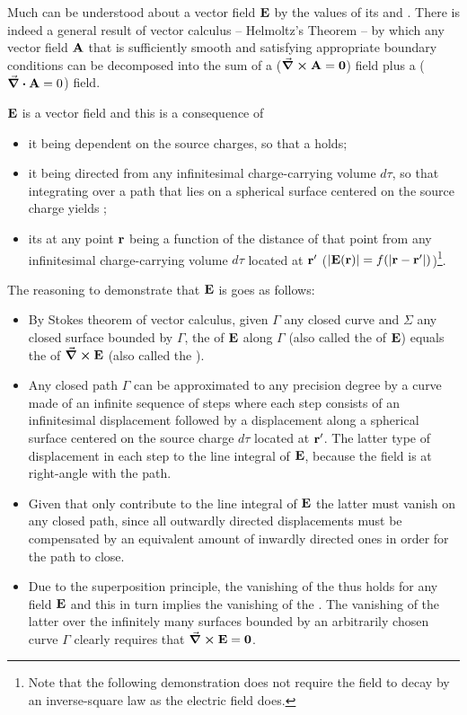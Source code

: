 Much can be understood about a vector field $\vb{E}$ by the values of its  and . There is indeed a general result of vector calculus -- Helmoltz's Theorem -- by which any vector field $\vb{A}$ that is sufficiently smooth and satisfying appropriate boundary conditions can be decomposed into the sum of a  ($\curl{\vb{A}}=\vb{0}$) field plus a  ($\div{\vb{A}}=0$) field.     

$\vb{E}$ is a   vector field and this is a consequence of 
\begin{itemize}
\item it being  dependent on the source charges, so that a  holds; 
\item it being directed  from any infinitesimal charge-carrying volume $d\tau$, so that integrating over a path that lies on a spherical surface centered on the source charge yields ; 
\item its  at any point $\vb{r}$ being a function of the distance of that point from any infinitesimal charge-carrying volume $d\tau$ located at $\vb{r}'$ ($\abs{\vb{E}(\vb{r})} = f(\abs{\vb{r} - \vb{r}'})$)\footnote{Note that the following demonstration does not require the field to decay by an inverse-square law as the electric field does.}. 
\end{itemize}

The reasoning to demonstrate that $\vb{E}$ is  goes as follows:
\begin{itemize}[-]
\item By Stokes theorem of vector calculus, given $\Gamma$ any closed curve and $\Sigma$ any closed surface bounded by  $\Gamma$, the  of $\vb{E}$ along $\Gamma$ (also called the  of $\vb{E}$) equals the  of $\curl{\vb{E}}$ (also called the ). 
\item Any closed path $\Gamma$ can be approximated to any precision degree by a curve made of an infinite sequence of steps where each step consists of an infinitesimal  displacement followed by a displacement along a spherical surface centered on the source charge $d\tau$ located at $\vb{r}'$. The latter type of displacement in each step  to the line integral of $\vb{E}$, because the field is at right-angle with the path.
\item Given that only  contribute to the line integral of $\vb{E}$ the latter must vanish on any closed path, since all outwardly directed displacements must be compensated by an equivalent amount of inwardly directed ones in order for the path to close.    
\item Due to the superposition principle, the vanishing of the  thus holds for any field $\vb{E}$ and this in turn implies the vanishing of the . The vanishing of the latter over the infinitely many surfaces bounded by an arbitrarily chosen curve $\Gamma$ clearly requires that $\curl{\vb{E}}=\vb{0}$.     
\end{itemize}

